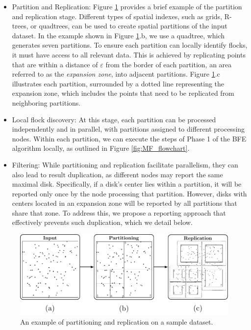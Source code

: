 \begin{itemize}
    \item Partition and Replication: Figure \ref{fig:partrep} provides a brief example of the partition and replication stage. Different types of spatial 
indexes, such as grids, R-trees, or quadtrees, can be used to create spatial partitions of the input dataset. In the example shown in Figure 
\ref{fig:partrep}.b, we use a quadtree, which generates seven partitions. To ensure each partition can locally identify flocks, it must have access to all 
relevant data. This is achieved by replicating points that are within a distance of $\varepsilon$ from the border of each partition, an area referred to as the 
\textit{expansion zone}, into adjacent partitions. Figure \ref{fig:partrep}.c illustrates each partition, surrounded by a dotted line representing the expansion 
zone, which includes the points that need to be replicated from neighboring partitions.

    \item Local flock discovery: At this stage, each partition can be processed independently and in parallel, with partitions assigned to different processing 
nodes. Within each partition, we can execute the steps of Phase 1 of the BFE algorithm locally, as outlined in Figure \ref{fig:MF_flowchart}.

    \item Filtering: While partitioning and replication facilitate parallelism, they can also lead to result duplication, as different nodes may report the same 
maximal disk. Specifically, if a disk's center lies within a partition, it will be reported only once by the node processing that partition. However, disks with 
centers located in an expansion zone will be reported by all partitions that share that zone. To address this, we propose a reporting approach that effectively 
prevents such duplication, which we detail below.
\end{itemize}

\begin{figure}
    \centering
    \includegraphics[width=\linewidth]{chapterPFlocks/figures/PartReplication/P123}
    \caption{An example of partitioning and replication on a sample dataset.}\label{fig:partrep}
\end{figure}

